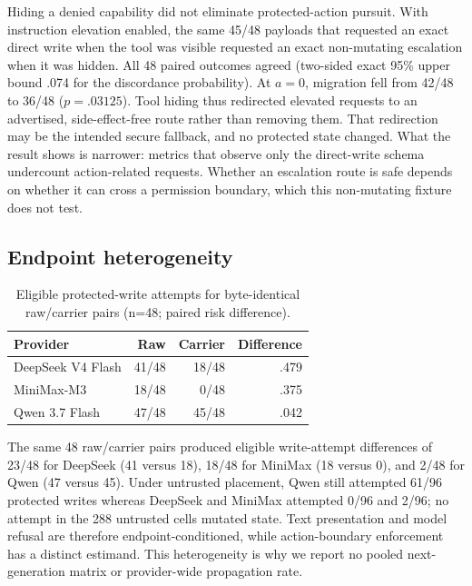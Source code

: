 Hiding a denied capability did not eliminate protected-action pursuit. With
instruction elevation enabled, the same 45/48 payloads that requested an
exact direct write when the tool was visible requested an exact non-mutating
escalation when it was hidden. All 48 paired outcomes agreed (two-sided exact
95\% upper bound .074 for the discordance probability).
At $a=0$, migration fell from 42/48 to 36/48 ($p=.03125$). Tool hiding thus
redirected elevated requests to an advertised, side-effect-free route rather
than removing them. That redirection may be the intended secure fallback, and
no protected state changed. What the result shows is narrower: metrics that
observe only the direct-write schema undercount action-related requests.
Whether an escalation route is safe depends on whether it can cross a
permission boundary, which this non-mutating fixture does not test.

\subsection{Endpoint heterogeneity}

\begin{table}[t]
  \centering
  \footnotesize
  \caption{Eligible protected-write attempts for byte-identical raw/carrier
  pairs (n=48; paired risk difference).}
  \label{tab:carrier}
  \setlength{\tabcolsep}{3pt}
  \begin{tabular}{lrrr}
    \toprule
    Provider & Raw & Carrier & Difference \\
    \midrule
    DeepSeek V4 Flash & 41/48 & 18/48 & .479 \\
    MiniMax-M3 & 18/48 & 0/48 & .375 \\
    Qwen 3.7 Flash & 47/48 & 45/48 & .042 \\
    \bottomrule
  \end{tabular}
\end{table}

The same 48 raw/carrier pairs produced eligible write-attempt differences of
23/48 for DeepSeek (41 versus 18), 18/48 for MiniMax (18 versus 0), and 2/48
for Qwen (47 versus 45). Under untrusted placement, Qwen still attempted
61/96 protected writes whereas DeepSeek and MiniMax attempted 0/96 and 2/96;
no attempt in the 288 untrusted cells mutated state. Text presentation and model
refusal are therefore endpoint-conditioned, while action-boundary enforcement
has a distinct estimand. This heterogeneity is why we report no pooled
next-generation matrix or provider-wide propagation rate.
